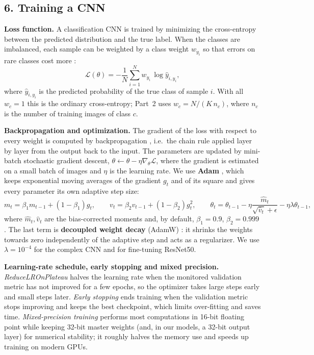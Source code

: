 \documentclass[12pt,letterpaper]{article}
\begin{document}
\subsection{6. Training a CNN}
\textbf{Loss function.} A classification CNN is trained by minimizing the cross-entropy between the predicted
distribution and the true label. When the classes are imbalanced, each sample can be weighted by a class weight
$w_{y_i}$ so that errors on rare classes cost more \cite{he2009}:
\begin{equation}
  \mathcal L(\theta) = -\frac{1}{N}\sum_{i=1}^{N} w_{y_i}\,\log \hat y_{i,y_i},
  \label{eq:ce}
\end{equation}
where $\hat y_{i,y_i}$ is the predicted probability of the true class of sample $i$. With all $w_c=1$ this is the
ordinary cross-entropy; Part~2 uses $w_c=N/(K\,n_c)$, where $n_c$ is the number of training images of class $c$.

\textbf{Backpropagation and optimization.} The gradient of the loss with respect to every weight is computed by
backpropagation \cite{rumelhart1986}, i.e.\ the chain rule applied layer by layer from the output back to the input.
The parameters are updated by mini-batch stochastic gradient descent, $\theta\leftarrow\theta-\eta\nabla_\theta
\mathcal L$, where the gradient is estimated on a small batch of images and $\eta$ is the learning rate. We use
\textbf{Adam} \cite{kingma2015}, which keeps exponential moving averages of the gradient $g_t$ and of its square and
gives every parameter its own adaptive step size:
\begin{equation}
  m_t=\beta_1m_{t-1}+(1-\beta_1)g_t,\qquad v_t=\beta_2v_{t-1}+(1-\beta_2)g_t^2,\qquad
  \theta_t=\theta_{t-1}-\eta\frac{\hat m_t}{\sqrt{\hat v_t}+\epsilon}-\eta\lambda\theta_{t-1},
  \label{eq:adam}
\end{equation}
where $\hat m_t,\hat v_t$ are the bias-corrected moments and, by default, $\beta_1=0.9$, $\beta_2=0.999$. The last
term is \textbf{decoupled weight decay} (AdamW) \cite{loshchilov2019}: it shrinks the weights towards zero
independently of the adaptive step and acts as a regularizer. We use $\lambda=10^{-4}$ for the complex CNN and for
fine-tuning ResNet50.

\textbf{Learning-rate schedule, early stopping and mixed precision.} \emph{ReduceLROnPlateau} halves the learning
rate when the monitored validation metric has not improved for a few epochs, so the optimizer takes large steps
early and small steps later. \emph{Early stopping} ends training when the validation metric stops improving and keeps
the best checkpoint, which limits over-fitting and saves time. \emph{Mixed-precision training}
\cite{micikevicius2018} performs most computations in 16-bit floating point while keeping 32-bit master weights (and,
in our models, a 32-bit output layer) for numerical stability; it roughly halves the memory use and speeds up
training on modern GPUs.
\end{document}
